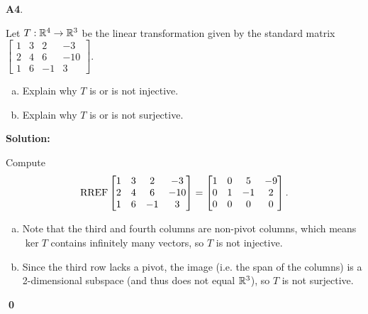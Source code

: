 \documentclass{article}
\newenvironment{problem}[1]
{
  \begin{flushleft}
  \textbf{#1}.
  \ignorespaces
}
{
  \end{flushleft}
}
\newenvironment{solution}
{
  \ignorespaces
  \textbf{Solution:}
}
{
  \ignorespacesafterend
  \begin{flushright}
  {\bfseries \qed}
  \end{flushright}
}
\begin{document}
\begin{problem}{A4}
Let $T: \mathbb{R}^4 \rightarrow \mathbb{R}^3$ be the linear transformation given by the standard matrix $\begin{bmatrix} 1 & 3 & 2 & -3 \\ 2 & 4 & 6 & -10 \\ 1 & 6 & -1 & 3 \end{bmatrix}$.
\begin{enumerate}[(a)]
\item Explain why \(T\) is or is not injective.
\item Explain why \(T\) is or is not surjective.
\end{enumerate}
\end{problem}
\begin{solution}
Compute \[\operatorname{RREF}\begin{bmatrix}1 & 3 & 2 & -3 \\ 2 & 4 & 6 & -10 \\ 1 & 6 & -1 & 3 \end{bmatrix} = \begin{bmatrix} 1 & 0 & 5 & -9 \\ 0 & 1 & -1 & 2 \\ 0 & 0 & 0 & 0\end{bmatrix}.\]
\begin{enumerate}[(a)]
\item Note that the third and fourth columns are non-pivot columns, which means \(\ker T\) contains infinitely many vectors, so \(T\) is not injective.
\item Since the third row lacks a pivot, the image (i.e. the span of the columns) is a 2-dimensional subspace (and thus does not equal \(\mathbb{R}^3\)), so \(T\) is not surjective.
\end{enumerate}
\end{solution}
\end{document}
